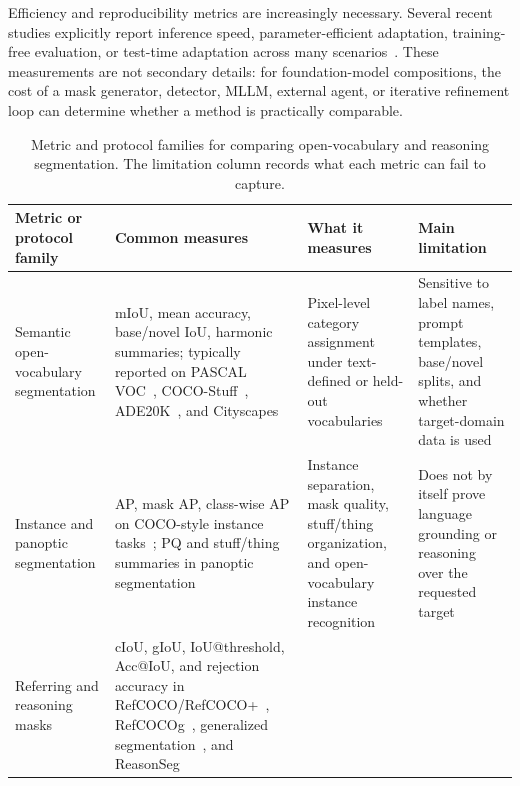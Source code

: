 Efficiency and reproducibility metrics are increasingly necessary. Several recent studies explicitly report inference speed, parameter-efficient adaptation, training-free evaluation, or test-time adaptation across many scenarios~\citep{shiyHarnessingVisionFoundation2025,noorimTesttimeAdaptationVisionlanguage2026,zpengParameterefficientFinetuningHyperspherical2025}. These measurements are not secondary details: for foundation-model compositions, the cost of a mask generator, detector, MLLM, external agent, or iterative refinement loop can determine whether a method is practically comparable.

\begin{table}[t]
\centering
\small
\setlength{\tabcolsep}{4pt}
\renewcommand{\arraystretch}{1.28}
\caption{Metric and protocol families for comparing open-vocabulary and reasoning segmentation. The limitation column records what each metric can fail to capture.}
\label{tab:metric-protocols}
\begin{tabularx}{\textwidth}{>{\raggedright\arraybackslash}p{}>{\raggedright\arraybackslash}X>{\raggedright\arraybackslash}p{}>{\raggedright\arraybackslash}p{}}
\toprule
Metric or protocol family & Common measures & What it measures & Main limitation \\
\midrule
Semantic open-vocabulary segmentation &
mIoU, mean accuracy, base/novel IoU, harmonic summaries; typically reported on PASCAL VOC~\citep{everingham2015pascal}, COCO-Stuff~\citep{caesar2018cocostuff}, ADE20K~\citep{zhou2017scene}, and Cityscapes~\citep{cordts2016cityscapes} &
Pixel-level category assignment under text-defined or held-out vocabularies &
Sensitive to label names, prompt templates, base/novel splits, and whether target-domain data is used~\citep{hhuangRenovatingNamesOpenvocabulary2024,ybenigmimFlossFreeLunch2025} \\
Instance and panoptic segmentation &
AP, mask AP, class-wise AP on COCO-style instance tasks~\citep{lin2014microsoft}; PQ and stuff/thing summaries in panoptic segmentation~\citep{kirillov2019panoptic} &
Instance separation, mask quality, stuff/thing organization, and open-vocabulary instance recognition &
Does not by itself prove language grounding or reasoning over the requested target \\
Referring and reasoning masks &
cIoU, gIoU, IoU@\allowbreak threshold, Acc@\allowbreak IoU, and rejection accuracy in RefCOCO/RefCOCO+~\citep{yu2016modeling}, RefCOCOg~\citep{mao2016generation}, generalized segmentation~\citep{xiaGsvaGeneralizedSegmentation2024}, and ReasonSeg~\citep{xlaiLisaReasoningSegmentation2024} &

\end{tabularx}
\end{table}
